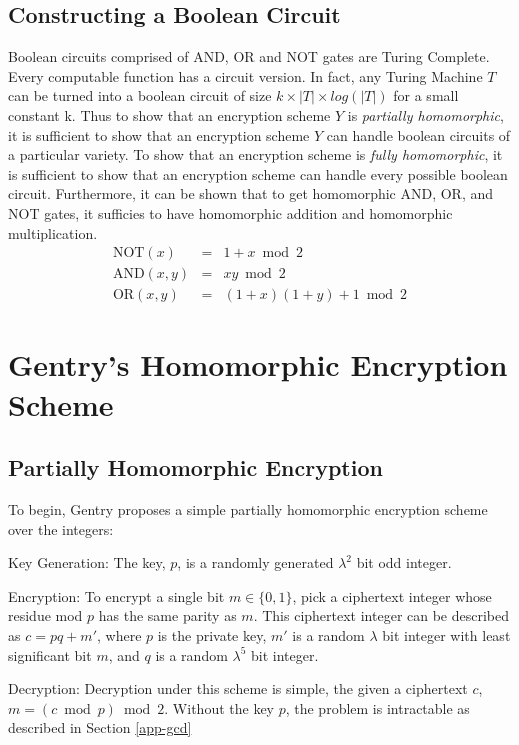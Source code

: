 \documentclass[a4paper,10pt]{article}
\begin{document}
\subsection{Constructing a Boolean Circuit}
Boolean circuits comprised of AND, OR and NOT gates are Turing
Complete. Every computable function has a circuit version. In fact,
any Turing Machine $T$ can be turned into a boolean circuit of size $k
\times |T| \times log(|T|)$ for a small constant k. Thus to show that
an encryption scheme $Y$ is \textit{partially homomorphic}, it is
sufficient to show that an encryption scheme $Y$ can handle boolean
circuits of a particular variety. To show that an encryption scheme is
\textit{fully homomorphic}, it is sufficient to show that an
encryption scheme can handle every possible boolean
circuit. Furthermore, it can be shown that to get homomorphic AND, OR,
and NOT gates, it sufficies to have homomorphic addition and
homomorphic multiplication.
\begin{eqnarray*}
\label{aoi}
\mathrm{NOT}(x) &=& 1+x \bmod 2\\
\mathrm{AND}(x,y) &=& xy \bmod 2\\
\mathrm{OR}(x,y) &=& (1+x)(1+y) + 1 \bmod 2
\end{eqnarray*}

\section{Gentry's Homomorphic Encryption Scheme}

\subsection{Partially Homomorphic Encryption}
To begin, Gentry proposes a simple partially homomorphic encryption
scheme over the integers:

Key Generation: The key, $p$, is a randomly generated $\lambda^2$ bit
odd integer.

Encryption: To encrypt a single bit $ m \in \{0,1\} $, pick a
ciphertext integer whose residue mod $ p $ has the same parity as
$m$. This ciphertext integer can be described as $ c = pq + m' $,
where $ p $ is the private key, $m'$ is a random $\lambda$ bit integer
with least significant bit $m$, and $q$ is a random $\lambda^5$ bit
integer.

Decryption: Decryption under this scheme is simple, the given a
ciphertext $c$, $ m = ( c \bmod p) \bmod 2 $. Without the key $p$, the
problem is intractable as described in Section \ref{app-gcd}
\end{document}
